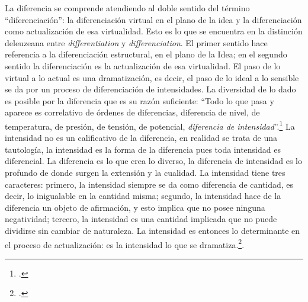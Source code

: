 La diferencia se comprende atendiendo al doble sentido del término \enquote{diferenciación}: la diferenciación virtual en el plano de la idea y la diferenciación como actualización de esa virtualidad. Esto es lo que se encuentra en la distinción deleuzeana entre \emph{differentiation} y \emph{differenciation}. El primer sentido hace referencia a la diferenciación estructural, en el plano de la Idea; en el segundo sentido la diferenciación es la actualización de esa virtualidad. El paso de lo virtual a lo actual es una dramatización, es decir, el paso de lo ideal a lo sensible se da por un proceso de diferenciación de intensidades. La diversidad de lo dado es posible por la diferencia que es su razón suficiente: \enquote{Todo lo que pasa y aparece es correlativo de órdenes de diferencias, diferencia de nivel, de temperatura, de presión, de tensión, de potencial, \emph{diferencia de intensidad}}.\footcite[333]{@6961-DELEUZE2002} La intensidad no es un calificativo de la diferencia, en realidad se trata de una tautología, la intensidad es la forma de la diferencia pues toda intensidad es diferencial. La diferencia es lo que crea lo diverso, la diferencia de intensidad es lo profundo de donde surgen la extensión y la cualidad. La intensidad tiene tres caracteres: primero, la intensidad siempre se da como diferencia de cantidad, es decir, lo inigualable en la cantidad misma; segundo, la intensidad hace de la diferencia un objeto de afirmación, y esto implica que no posee ninguna negatividad; tercero, la intensidad es una cantidad implicada que no puede dividirse sin cambiar de naturaleza. La intensidad es entonces lo determinante en el proceso de actualización: es la intensidad lo que se dramatiza.\footcite{@6975-DELEUZE2005}.

